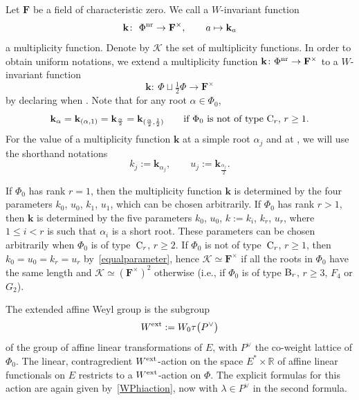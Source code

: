 \documentclass[11pt]{article}
\numberwithin{equation}{section}
\numberwithin{equation}{section}
\begin{document}
Let $\mathbf{F}$ be a field of characteristic zero. We call a $W$-invariant function
\[
\mathbf{k}\colon\ \Phi^{\textup{nr}}\rightarrow\mathbf{F}^\times,\qquad a\mapsto \mathbf{k}_a
\]
a multiplicity function. Denote by $\mathcal{K}$ the set of multiplicity functions.
In order to obtain uniform notations, we extend a multiplicity function
$\mathbf{k}\colon \Phi^{\textup{nr}}\rightarrow\mathbf{F}^\times$ to a $W$-invariant function
\[
\mathbf{k}\colon\ \Phi\sqcup\tfrac{1}{2}\Phi\rightarrow\mathbf{F}^\times
\]
by declaring  when . Note that for any root $\alpha\in\Phi_0$,
\begin{equation}
\label{equalparameter}
\mathbf{k}_\alpha=\mathbf{k}_{(\alpha,1)}=\mathbf{k}_{\frac{\alpha}{2}}=\mathbf{k}_{(\frac{\alpha}{2},\frac{1}{2})}\qquad \textup{if $\Phi_0$ is not of type ${\rm C}_r$, $r\geq 1$}.
\end{equation}
For the value of a multiplicity function $\mathbf{k}$ at a simple root $\alpha_j$ and at , we will use the shorthand notations
\[
k_j:=\mathbf{k}_{\alpha_j},\qquad u_j:=\mathbf{k}_{\frac{\alpha_j}{2}}.
\]

If $\Phi_0$ has rank $r=1$, then
the multiplicity function $\mathbf{k}$ is determined by the four parameters $k_0$, $u_0$, $k_1$, $u_1$, which can be chosen arbitrarily.
If $\Phi_0$ has rank $r>1$, then $\mathbf{k}$ is determined by the five parameters $k_0$, $u_0$, $k:=k_i$, $k_r$, $u_r$, where $1\leq i<r$ is such that $\alpha_i$ is a short root. These parameters can be chosen arbitrarily
when $\Phi_0$ is of type~${\rm C}_r$, $r\geq 2$. If $\Phi_0$ is not of type~${\rm C}_r$, $r\geq 1$,
then $k_0=u_0=k_r=u_r$ by~\eqref{equalparameter}, hence $\mathcal{K}\simeq\mathbf{F}^\times$ if all the roots in $\Phi_0$ have the same length and $\mathcal{K}\simeq (\mathbf{F}^\times)^2$ otherwise (i.e., if $\Phi_0$ is of type $\textup{B}_r$, $r\geq 3$, $F_4$ or $G_2$).

The extended affine Weyl group is the subgroup
\[
W^{\textup{ext}}:=W_0\tau\bigl(P^\vee\bigr)
\]
of the group of affine linear transformations of $E$,
with $P^\vee$ the co-weight lattice of $\Phi_0$. The linear, contragredient $W^{\textup{ext}}$-action on the space $E^*\times\mathbb{R}$ of affine linear functionals on $E$ restricts to a $W^{\textup{ext}}$-action on $\Phi$. The explicit formulas for this action are again given by~\eqref{WPhiaction}, now with $\lambda\in P^\vee$ in the second formula.
\end{document}
